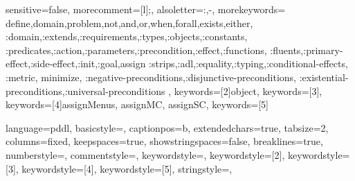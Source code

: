 
{
  sensitive=false,    %
  morecomment=[l]{;}, %
  alsoletter={:,-},   %
  morekeywords={
    define,domain,problem,not,and,or,when,forall,exists,either,
    :domain,:extends,:requirements,:types,:objects,:constants,
    :predicates,:action,:parameters,:precondition,:effect,:functions,
    :fluents,:primary-effect,:side-effect,:init,:goal,assign
    :strips,:adl,:equality,:typing,:conditional-effects, :metric, minimize,
    :negative-preconditions,:disjunctive-preconditions,
    :existential-preconditions,:universal-preconditions
  },
  keywords=[2]{object}, %
  keywords=[3]{}, %
  keywords=[4]{assignMenus, assignMC, assignSC}, %
  keywords=[5]{} %
}

\lstset
{
  language={pddl},
  basicstyle=\small\ttfamily, %
  captionpos=b, %
  extendedchars=true, %
  tabsize=2, %
  columns=fixed,
  keepspaces=true,
  showstringspaces=false,
  breaklines=true,
  numberstyle=\tiny\ttfamily, %
  commentstyle=\color{mygrey}, %
  keywordstyle=\color{mygreen}, %
  keywordstyle=[2]\color{mymauve},
  keywordstyle=[3]\color{myorange},
  keywordstyle=[4]\color{myblue},
  keywordstyle=[5]\color{myred},
  stringstyle=\color{blue}, %
}
